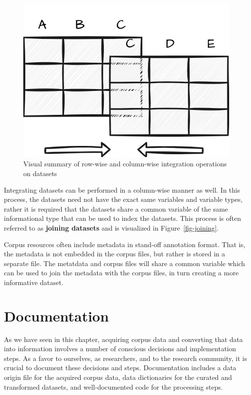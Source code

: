 \documentclass[
  letterpaper,
]{book}
\theoremstyle{definition}
\theoremstyle{remark}
\begin{document}
\begin{figure}[!htb]
\begin{minipage}{0.55\linewidth}
{\includegraphics{part_2/figures/integration-join-visual.drawio.png}

}


\end{minipage}%

\caption{\label{fig-data-integration}Visual summary of row-wise and
column-wise integration operations on datasets}

\end{figure}%

Integrating datasets can be performed in a column-wise manner as well.
In this process, the datasets need not have the exact same variables and
variable types, rather it is required that the datasets share a common
variable of the same informational type that can be used to index the
datasets. This process is often referred to as \textbf{joining datasets}
and is visualized in Figure~\ref{fig-joining}.

Corpus resources often include metadata in stand-off annotation format.
That is, the metadata is not embedded in the corpus files, but rather is
stored in a separate file. The metatdata and corpus files will share a
common variable which can be used to join the metadata with the corpus
files, in turn creating a more informative dataset.

\section{Documentation}\label{sec-data-documentation}

As we have seen in this chapter, acquiring corpus data and converting
that data into information involves a number of conscious decisions and
implementation steps. As a favor to ourselves, as researchers, and to
the research community, it is crucial to document these decisions and
steps. Documentation includes a data origin file for the acquired corpus
data, data dictionaries for the curated and transformed datasets, and
well-documented code for the processing steps.
\end{document}
